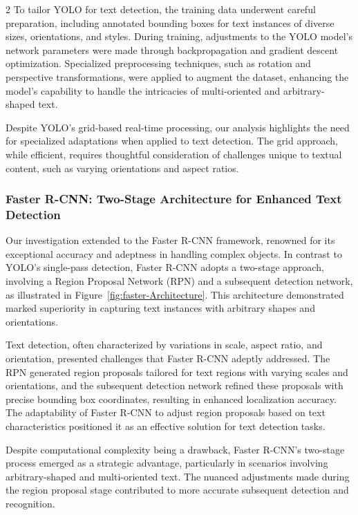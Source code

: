 \documentclass[sn-mathphys,Numbered]{sn-jnl}%
\begin{document}
\begin{multicols}{2}
To tailor YOLO for text detection, the training data underwent careful preparation, including annotated bounding boxes for text instances of diverse sizes, orientations, and styles. During training, adjustments to the YOLO model's network parameters were made through backpropagation and gradient descent optimization. Specialized preprocessing techniques, such as rotation and perspective transformations, were applied to augment the dataset, enhancing the model's capability to handle the intricacies of multi-oriented and arbitrary-shaped text.

Despite YOLO's grid-based real-time processing, our analysis highlights the need for specialized adaptations when applied to text detection. The grid approach, while efficient, requires thoughtful consideration of challenges unique to textual content, such as varying orientations and aspect ratios.

\subsubsection{Faster R-CNN: Two-Stage Architecture for Enhanced Text Detection}

Our investigation extended to the Faster R-CNN framework, renowned for its exceptional accuracy and adeptness in handling complex objects. In contrast to YOLO's single-pass detection, Faster R-CNN adopts a two-stage approach, involving a Region Proposal Network (RPN) and a subsequent detection network, as illustrated in Figure~\ref{fig:faster-Architecture}. This architecture demonstrated marked superiority in capturing text instances with arbitrary shapes and orientations.

Text detection, often characterized by variations in scale, aspect ratio, and orientation, presented challenges that Faster R-CNN adeptly addressed. The RPN generated region proposals tailored for text regions with varying scales and orientations, and the subsequent detection network refined these proposals with precise bounding box coordinates, resulting in enhanced localization accuracy. The adaptability of Faster R-CNN to adjust region proposals based on text characteristics positioned it as an effective solution for text detection tasks.

Despite computational complexity being a drawback, Faster R-CNN's two-stage process emerged as a strategic advantage, particularly in scenarios involving arbitrary-shaped and multi-oriented text. The nuanced adjustments made during the region proposal stage contributed to more accurate subsequent detection and recognition.


\end{multicols}
\end{document}
